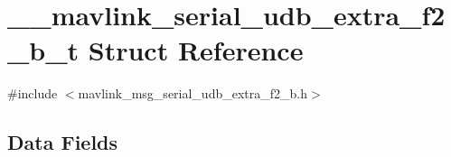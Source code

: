 \hypertarget{struct____mavlink__serial__udb__extra__f2__b__t}{\section{\+\_\+\+\_\+mavlink\+\_\+serial\+\_\+udb\+\_\+extra\+\_\+f2\+\_\+b\+\_\+t Struct Reference}
\label{struct____mavlink__serial__udb__extra__f2__b__t}
}


{\ttfamily \#include $<$mavlink\+\_\+msg\+\_\+serial\+\_\+udb\+\_\+extra\+\_\+f2\+\_\+b.\+h$>$}

\subsection*{Data Fields}
